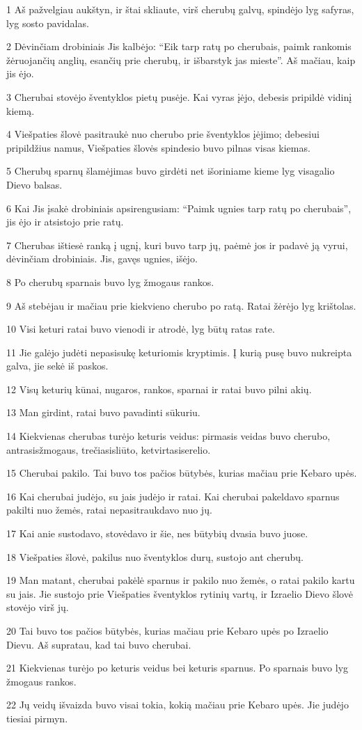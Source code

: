 \par 1 Aš pažvelgiau aukštyn, ir štai skliaute, virš cherubų galvų, spindėjo lyg safyras, lyg sosto pavidalas. 
\par 2 Dėvinčiam drobiniais Jis kalbėjo: “Eik tarp ratų po cherubais, paimk rankomis žėruojančių anglių, esančių prie cherubų, ir išbarstyk jas mieste”. Aš mačiau, kaip jis ėjo. 
\par 3 Cherubai stovėjo šventyklos pietų pusėje. Kai vyras įėjo, debesis pripildė vidinį kiemą. 
\par 4 Viešpaties šlovė pasitraukė nuo cherubo prie šventyklos įėjimo; debesiui pripildžius namus, Viešpaties šlovės spindesio buvo pilnas visas kiemas. 
\par 5 Cherubų sparnų šlamėjimas buvo girdėti net išoriniame kieme lyg visagalio Dievo balsas. 
\par 6 Kai Jis įsakė drobiniais apsirengusiam: “Paimk ugnies tarp ratų po cherubais”, jis ėjo ir atsistojo prie ratų. 
\par 7 Cherubas ištiesė ranką į ugnį, kuri buvo tarp jų, paėmė jos ir padavė ją vyrui, dėvinčiam drobiniais. Jis, gavęs ugnies, išėjo. 
\par 8 Po cherubų sparnais buvo lyg žmogaus rankos. 
\par 9 Aš stebėjau ir mačiau prie kiekvieno cherubo po ratą. Ratai žėrėjo lyg krištolas. 
\par 10 Visi keturi ratai buvo vienodi ir atrodė, lyg būtų ratas rate. 
\par 11 Jie galėjo judėti nepasisukę keturiomis kryptimis. Į kurią pusę buvo nukreipta galva, jie sekė iš paskos. 
\par 12 Visų keturių kūnai, nugaros, rankos, sparnai ir ratai buvo pilni akių. 
\par 13 Man girdint, ratai buvo pavadinti sūkuriu. 
\par 14 Kiekvienas cherubas turėjo keturis veidus: pirmasis veidas buvo cherubo, antrasis­žmogaus, trečiasis­liūto, ketvirtasis­erelio. 
\par 15 Cherubai pakilo. Tai buvo tos pačios būtybės, kurias mačiau prie Kebaro upės. 
\par 16 Kai cherubai judėjo, su jais judėjo ir ratai. Kai cherubai pakeldavo sparnus pakilti nuo žemės, ratai nepasitraukdavo nuo jų. 
\par 17 Kai anie sustodavo, stovėdavo ir šie, nes būtybių dvasia buvo juose. 
\par 18 Viešpaties šlovė, pakilus nuo šventyklos durų, sustojo ant cherubų. 
\par 19 Man matant, cherubai pakėlė sparnus ir pakilo nuo žemės, o ratai pakilo kartu su jais. Jie sustojo prie Viešpaties šventyklos rytinių vartų, ir Izraelio Dievo šlovė stovėjo virš jų. 
\par 20 Tai buvo tos pačios būtybės, kurias mačiau prie Kebaro upės po Izraelio Dievu. Aš supratau, kad tai buvo cherubai. 
\par 21 Kiekvienas turėjo po keturis veidus bei keturis sparnus. Po sparnais buvo lyg žmogaus rankos. 
\par 22 Jų veidų išvaizda buvo visai tokia, kokią mačiau prie Kebaro upės. Jie judėjo tiesiai pirmyn.



